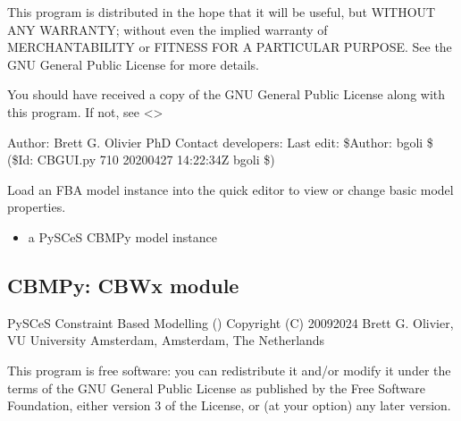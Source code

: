\documentclass[letterpaper,12pt,english]{sphinxmanual}
\begin{document}
\sphinxAtStartPar
This program is distributed in the hope that it will be useful,
but WITHOUT ANY WARRANTY; without even the implied warranty of
MERCHANTABILITY or FITNESS FOR A PARTICULAR PURPOSE.  See the
GNU General Public License for more details.

\sphinxAtStartPar
You should have received a copy of the GNU General Public License
along with this program.  If not, see \textless{}\textgreater{}

\sphinxAtStartPar
Author: Brett G. Olivier PhD
Contact developers: 
Last edit: \$Author: bgoli \$ (\$Id: CBGUI.py 710 2020\sphinxhyphen{}04\sphinxhyphen{}27 14:22:34Z bgoli \$)

\begin{fulllineitems}
\label{\detokenize{api/visualization:cbmpy.CBGUI.loadCBGUI}}
\pysigstartsignatures
\pysiglinewithargsret
{}
{\sphinxparamcomma {}}
{}
\pysigstopsignatures
\sphinxAtStartPar
Load an FBA model instance into the quick editor to view or change basic
model properties.
\begin{itemize}
\item {} 
\sphinxAtStartPar
{} a PySCeS CBMPy model instance

\end{itemize}

\end{fulllineitems}


\subsection{CBMPy: CBWx module}
\label{\detokenize{api/visualization:cbmpy-cbwx-module}}\label{\detokenize{api/visualization:module-cbmpy.CBWx}}
\sphinxAtStartPar
PySCeS Constraint Based Modelling ()
Copyright (C) 2009\sphinxhyphen{}2024 Brett G. Olivier, VU University Amsterdam, Amsterdam, The Netherlands

\sphinxAtStartPar
This program is free software: you can redistribute it and/or modify
it under the terms of the GNU General Public License as published by
the Free Software Foundation, either version 3 of the License, or
(at your option) any later version.
\end{document}
